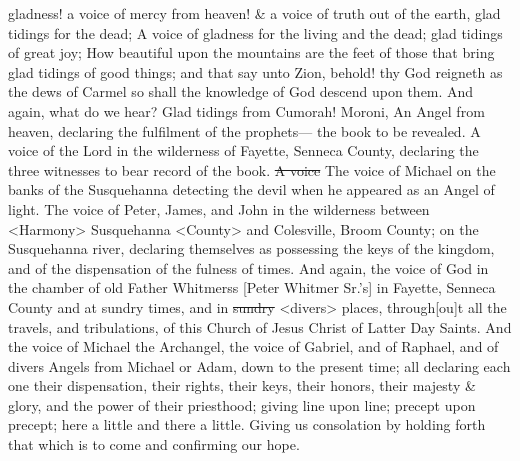 gladness! a voice of mercy from heaven! \& a voice of truth out of the earth, glad tidings for the dead; A voice of gladness for the living and the dead; glad tidings of great joy; How beautiful upon the mountains are the feet of those that bring glad tidings of good things; and that say unto Zion, behold! thy God reigneth as the dews of Carmel so shall the knowledge of God descend upon them. And again, what do we hear? Glad tidings from Cumorah! Moroni, An Angel from heaven, declaring the fulfilment of the prophets--- the book to be revealed. A voice of the Lord in the wilderness of Fayette, Senneca County, declaring the three witnesses to bear record of the book. \sout{A voice} The voice of Michael on the banks of the Susquehanna detecting the devil when he appeared as an Angel of light. The voice of Peter, James, and John in the wilderness between <Harmony> Susquehanna <County> and Colesville, Broom County; on the Susquehanna river, declaring themselves as possessing the keys of the kingdom, and of the dispensation of the fulness of times. And again, the voice of God in the chamber of old Father Whitmerss [Peter Whitmer Sr.'s] in Fayette, Senneca County and at sundry times, and in \sout{sundry} <divers> places, through[ou]t all the travels, and tribulations, of this Church of Jesus Christ of Latter Day Saints. And the voice of Michael the Archangel, the voice of Gabriel, and of Raphael, and of divers Angels from Michael or Adam, down to the present time; all declaring each one their dispensation, their rights, their keys, their honors, their majesty \& glory, and the power of their priesthood; giving line upon line; precept upon precept; here a little and there a little. Giving us consolation by holding forth that which is to come and confirming our hope.

